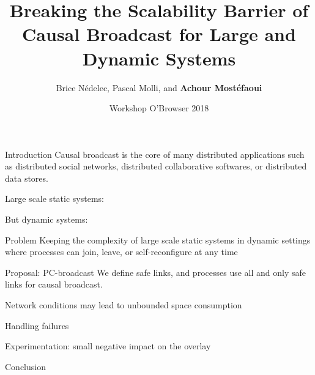 \documentclass[10pt, xcolor={usenames, dvipsnames}]{beamer}
\title{Breaking the Scalability Barrier of Causal Broadcast for Large and Dynamic Systems}
\author{Brice N\'edelec, Pascal Molli, and \textbf{Achour Most{\'e}faoui}}
\date{Workshop O'Browser 2018}
\institute{University of Nantes, LS2N}
\newcommand{\YES}[1]{\textcolor{green}{#1}}
\newcommand{\NO}[1]{\textcolor{red}{#1}}
\begin{document}
\maketitle

\begin{frame}{Introduction}
  Causal broadcast is the core of many distributed applications such as
  distributed social networks, distributed collaborative softwares, or
  distributed data stores.
\end{frame}

\begin{frame}{Large scale static systems: \YES{}}
\end{frame}

\begin{frame}{But dynamic systems: \NO{}}
\end{frame}

\begin{frame}{Problem}
  Keeping the complexity of large scale static systems in dynamic settings where
  processes can join, leave, or self-reconfigure at any time
\end{frame}

\begin{frame}{Proposal: PC-broadcast}
  We define safe links, and processes use all and only safe links for causal broadcast.
\end{frame}

\begin{frame}{Network conditions may lead to unbounded space consumption}
\end{frame}

\begin{frame}{Handling failures}
\end{frame}

\begin{frame}{Experimentation: small negative impact on the overlay}
\end{frame}

\begin{frame}{Conclusion}
\end{frame}
\end{document}
